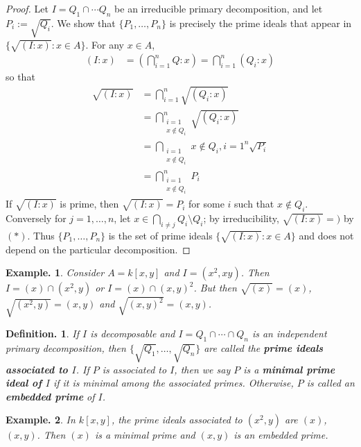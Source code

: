 \documentclass[11pt, a4paper]{memoir}
\theoremstyle{change}
\theoremstyle{plain}
\theoremstyle{nonumberplain}
\newtheorem{definition}{Definition.}
\newtheorem{example}{Example.}
\newtheorem{proof}{Proof}
\numberwithin{equation}{section}
\begin{document}
\begin{proof}
    Let $I=Q_1\cap\cdots Q_n$ be an irreducible primary decomposition, and let $P_i:=\sqrt{Q_i}$.
    We show that $\{P_1,\ldots,P_n\}$ is precisely the prime ideals that appear in $\{\sqrt{(I:x)}:x\in A\}$.
    For any $x\in A$,
    \begin{align*}
        (I:x) &= \left(\bigcap_{i=1}^n Q:x\right)=\bigcap_{i=1}^n(Q_i:x)
    \end{align*}
    so that
    \begin{align*}
        \sqrt{(I:x)} &= \bigcap_{i=1}^n\sqrt{(Q_i:x)}\\
                     &= \bigcap_{\substack{i=1\\x\notin Q_i}}^n\sqrt{(Q_i:x)}\\
                     &= \bigcap_{\substack{i=1\\x\notin Q_i}}{x\notin Q_i,i=1}^n\sqrt{P_i}\\
                     &= \bigcap_{\substack{i=1\\x\notin Q_i}}^nP_i\tag{$*$}
    \end{align*}
    If $\sqrt{(I:x)}$ is prime, then $\sqrt{(I:x)}=P_i$ for some $i$ such that $x\notin Q_i$.
    Conversely for $j=1,\ldots,n$, let $x\in\bigcap_{i\neq j}Q_i\setminus Q_i$; by irreducibility, $\sqrt{(I:x)}=)$ by $(*)$.
    Thus $\{P_1,\ldots,P_n\}$ is the set of prime ideals $\{\sqrt{(I:x)}:x\in A\}$ and does not depend on the particular decomposition.
\end{proof}
\begin{example}
    Consider $A=k[x,y]$ and $I=(x^2,xy)$.
    Then $I=(x)\cap(x^2,y)$ or $I=(x)\cap(x,y)^2$.
    But then $\sqrt{(x)}=(x)$, $\sqrt{(x^2,y)}=(x,y)$ and $\sqrt{(x,y)^2}=(x,y)$.
\end{example}
\begin{definition}
    If $I$ is decomposable and $I=Q_1\cap\cdots\cap Q_n$ is an independent primary decomposition, then $\{\sqrt{Q_1},\ldots,\sqrt{Q_n}\}$ are called the \textbf{prime ideals associated to $I$}.
    If $P$ is associated to $I$, then we say $P$ is a \textbf{minimal prime ideal of $I$} if it is minimal among the associated primes.
    Otherwise, $P$ is called an \textbf{embedded prime} of $I$.
\end{definition}
\begin{example}
    In $k[x,y]$, the prime ideals associated to $(x^2,y)$ are $(x)$, $(x,y)$.
    Then $(x)$ is a minimal prime and $(x,y)$ is an embedded prime.
\end{example}
\end{document}
